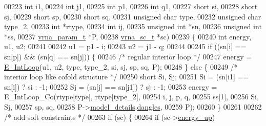 \begin{DoxyCode}
00223                    \textcolor{keywordtype}{int}            i1,
00224                    \textcolor{keywordtype}{int}            j1,
00225                    \textcolor{keywordtype}{int}            p1,
00226                    \textcolor{keywordtype}{int}            q1,
00227                    \textcolor{keywordtype}{short}          si,
00228                    \textcolor{keywordtype}{short}          sj,
00229                    \textcolor{keywordtype}{short}          sp,
00230                    \textcolor{keywordtype}{short}          sq,
00231                    \textcolor{keywordtype}{unsigned} \textcolor{keywordtype}{char}  type,
00232                    \textcolor{keywordtype}{unsigned} \textcolor{keywordtype}{char}  type\_2,
00233                    \textcolor{keywordtype}{int}            *rtype,
00234                    \textcolor{keywordtype}{int}            ij,
00235                    \textcolor{keywordtype}{unsigned} \textcolor{keywordtype}{int}   *sn,
00236                    \textcolor{keywordtype}{unsigned} \textcolor{keywordtype}{int}   *ss,
00237                    \hyperlink{group__energy__parameters_structvrna__param__s}{vrna\_param\_t}   *P,
00238                    \hyperlink{group__soft__constraints_structvrna__sc__s}{vrna\_sc\_t}      *sc)
00239 \{
00240   \textcolor{keywordtype}{int} energy, u1, u2;
00241 
00242   u1  = p1 - i;
00243   u2  = j1 - q;
00244 
00245   \textcolor{keywordflow}{if} ((sn[i] == sn[p]) && (sn[q] == sn[j])) \{
00246     \textcolor{comment}{/* regular interior loop */}
00247     energy = \hyperlink{group__loops_gaafbc187b7f78e8e82afb77dd6f3b8fc5}{E\_IntLoop}(u1, u2, type, type\_2, si, sj, sp, sq, P);
00248   \} \textcolor{keywordflow}{else} \{
00249     \textcolor{comment}{/* interior loop like cofold structure */}
00250     \textcolor{keywordtype}{short} Si, Sj;
00251     Si      = (sn[i1] == sn[i]) ? si : -1;
00252     Sj      = (sn[j] == sn[j1]) ? sj : -1;
00253     energy  = E\_IntLoop\_Co(rtype[type], rtype[type\_2],
00254                            i, j, p, q,
00255                            ss[1],
00256                            Si, Sj,
00257                            sp, sq,
00258                            P->\hyperlink{group__energy__parameters_a7b84353eb9075c595bad4ceb871bcae7}{model\_details}.\hyperlink{group__model__details_adcda4ff2ea77748ae0e8700288282efc}{dangles},
00259                            P);
00260   \}
00261 
00262   \textcolor{comment}{/* add soft constraints */}
00263   \textcolor{keywordflow}{if} (sc) \{
00264     \textcolor{keywordflow}{if} (sc->\hyperlink{group__soft__constraints_a57e4dbb924ab11f304e3762a3a9b07a1}{energy\_up})

\end{DoxyCode}
